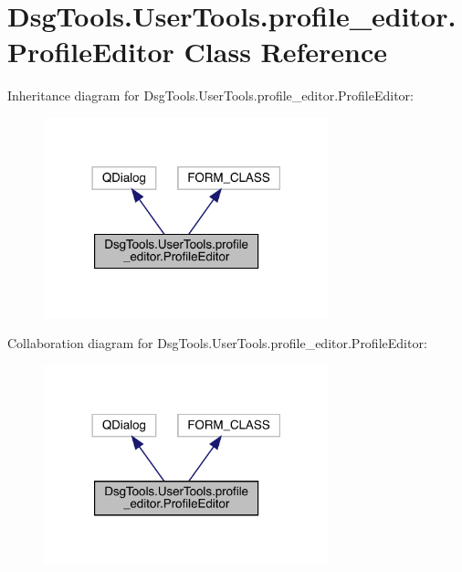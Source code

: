 \hypertarget{class_dsg_tools_1_1_user_tools_1_1profile__editor_1_1_profile_editor}{}\section{Dsg\+Tools.\+User\+Tools.\+profile\+\_\+editor.\+Profile\+Editor Class Reference}
\label{class_dsg_tools_1_1_user_tools_1_1profile__editor_1_1_profile_editor}


Inheritance diagram for Dsg\+Tools.\+User\+Tools.\+profile\+\_\+editor.\+Profile\+Editor\+:
\nopagebreak
\begin{figure}[H]
\begin{center}
\leavevmode
\includegraphics[width=234pt]{class_dsg_tools_1_1_user_tools_1_1profile__editor_1_1_profile_editor__inherit__graph}
\end{center}
\end{figure}


Collaboration diagram for Dsg\+Tools.\+User\+Tools.\+profile\+\_\+editor.\+Profile\+Editor\+:
\nopagebreak
\begin{figure}[H]
\begin{center}
\leavevmode
\includegraphics[width=234pt]{class_dsg_tools_1_1_user_tools_1_1profile__editor_1_1_profile_editor__coll__graph}
\end{center}
\end{figure}
